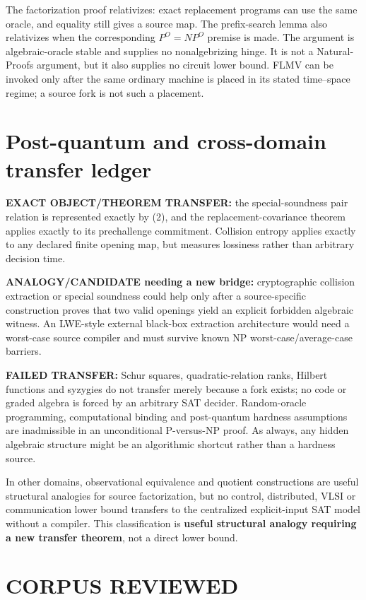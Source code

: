 \documentclass[11pt]{article}
\begin{document}
The factorization proof relativizes: exact replacement programs can use the
same oracle, and equality still gives a source map.  The prefix-search lemma
also relativizes when the corresponding $P^O=NP^O$ premise is made.  The
argument is algebraic-oracle stable and supplies no nonalgebrizing hinge.
It is not a Natural-Proofs argument, but it also supplies no circuit lower
bound.  FLMV can be invoked only after the same ordinary machine is placed in
its stated time--space regime; a source fork is not such a placement.

\section{Post-quantum and cross-domain transfer ledger}

\textbf{EXACT OBJECT/THEOREM TRANSFER:} the special-soundness pair relation
is represented exactly by (2), and the replacement-covariance theorem applies
exactly to its prechallenge commitment.  Collision entropy applies exactly to
any declared finite opening map, but measures lossiness rather than arbitrary
decision time.

\textbf{ANALOGY/CANDIDATE needing a new bridge:} cryptographic collision
extraction or special soundness could help only after a source-specific
construction proves that two valid openings yield an explicit forbidden
algebraic witness.  An LWE-style external black-box extraction architecture
would need a worst-case source compiler and must survive known NP
worst-case/average-case barriers.

\textbf{FAILED TRANSFER:} Schur squares, quadratic-relation ranks, Hilbert
functions and syzygies do not transfer merely because a fork exists; no code
or graded algebra is forced by an arbitrary SAT decider.  Random-oracle
programming, computational binding and post-quantum hardness assumptions are
inadmissible in an unconditional P-versus-NP proof.  As always, any hidden
algebraic structure might be an algorithmic shortcut rather than a hardness
source.

In other domains, observational equivalence and quotient constructions are
useful structural analogies for source factorization, but no control,
distributed, VLSI or communication lower bound transfers to the centralized
explicit-input SAT model without a compiler.  This classification is
\textbf{useful structural analogy requiring a new transfer theorem}, not a
direct lower bound.

\section{CORPUS REVIEWED}
\end{document}
